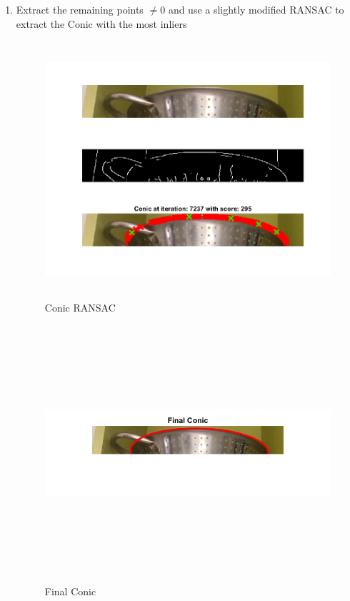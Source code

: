 \begin{enumerate}
    \item Extract the remaining points $\neq 0$ and use a slightly modified RANSAC to extract the Conic with the most inliers 
                \begin{figure}[H]
    \centering
    \includegraphics[height=9.5cm, width=\textwidth, keepaspectratio]{Report/Images/Features/Conic/ConicRANSAC.png}
    \caption{\label{fig:conic:ransac}Conic RANSAC}
    \end{figure}

                    \begin{figure}[H]
    \centering
    \includegraphics[height=9.5cm, width=\textwidth, keepaspectratio]{Report/Images/Features/Conic/FinalConic.png}
    \caption{\label{fig:conic:final}Final Conic}
    \end{figure}

    
\end{enumerate}

